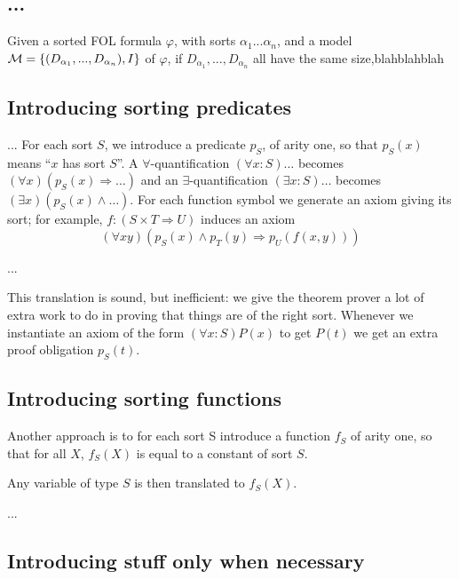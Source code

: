 \subsection{...}

\begin{lemma}
\label{lm:remove_sorts}
Given a sorted FOL formula $\varphi$, with sorts $\alpha_1 ... \alpha_n$, and a model  
$\mathcal{M} = \{{(D_{\alpha_1},...,D_{\alpha_n}),I}\}$ of $\varphi$, 
if $D_{\alpha_1},...,D_{\alpha_n}$ all have the same size,blahblahblah
\end{lemma}

\subsection{Introducing sorting predicates}

... For each sort $S$, we introduce a predicate $p_S$, of arity one,
so that $p_S(x)$ means ``$x$ has sort $S$''. A
$\forall$-quantification $(\forall x:S)\ldots$ becomes $(\forall
x)(p_S(x) \Rightarrow \ldots)$ and an $\exists$-quantification
$(\exists x:S)\ldots$ becomes $(\exists x)(p_S(x) \land \ldots)$. For
each function symbol we generate an axiom giving its sort; for
example, $f : (S \times T \Rightarrow U)$ induces an axiom
\begin{displaymath}
(\forall x y)(p_S(x) \land p_T(y) \Rightarrow p_U(f(x, y)))
\end{displaymath}

...

This translation is sound, but inefficient: we give the theorem prover
a lot of extra work to do in proving that things are of the right
sort. Whenever we instantiate an axiom of the form $(\forall
x:S)P(x)$ to get $P(t)$ we get an extra proof obligation $p_S(t)$.

\subsection{Introducing sorting functions}

Another approach is to for each sort S introduce a function $f_S$ of
arity one, so that for all $X$, $f_S(X)$ is equal to a constant of sort $S$. 

Any variable of type $S$ is then translated to $f_S(X)$.

...

\subsection{Introducing stuff only when necessary}

